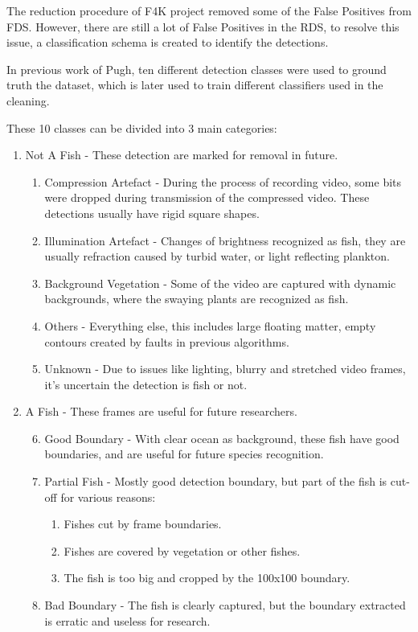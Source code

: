 \documentclass[bsc,logo,twoside,fullspacing,parskip]{infthesis}
\begin{document}
The reduction procedure of F4K project removed some of the False Positives from FDS. 
However, there are still a lot of False Positives in the RDS, to resolve this issue, a classification schema is created to identify the detections.

In previous work of Pugh\cite{P1}, ten different detection classes were used to ground truth the dataset, which is later used to train different classifiers used in the cleaning. 

These 10 classes can be divided into 3 main categories:

\renewcommand{\labelenumi}{\Roman{enumi}}
\renewcommand{\labelenumii}{\arabic{enumii}}
\renewcommand{\labelenumiii}{\roman{enumiii}}
\begin{enumerate}
 \item Not A Fish - These detection are marked for removal in future.
 \begin{enumerate}
   \item Compression Artefact - During the process of recording video, some bits were dropped during transmission of the compressed video. These detections usually have rigid square shapes.
   \item Illumination Artefact - Changes of brightness recognized as fish, they are usually refraction caused by turbid water, or light reflecting plankton.
   \item Background Vegetation - Some of the video are captured with dynamic backgrounds, where the swaying plants are recognized as fish.
   \item Others - Everything else, this includes large floating matter, empty contours created by faults in previous algorithms.
   \item Unknown - Due to issues like lighting, blurry and stretched video frames, it's uncertain the detection is fish or not.
 \end{enumerate}
 
 \item A Fish - These frames are useful for future researchers.
 \begin{enumerate}
   \setcounter{enumii}{5} 
   \item Good Boundary - With clear ocean as background, these fish have good boundaries, and are useful for future species recognition.
   \item Partial Fish - Mostly good detection boundary, but part of the fish is cut-off for various reasons:
    \begin{enumerate}
      \item Fishes cut by frame boundaries.
      \item Fishes are covered by vegetation or other fishes.
      \item The fish is too big and cropped by the 100x100 boundary.
    \end{enumerate}
   \item Bad Boundary - The fish is clearly captured, but the boundary extracted is erratic and useless for research. 
 \end{enumerate}
 

\end{enumerate}
\end{document}
